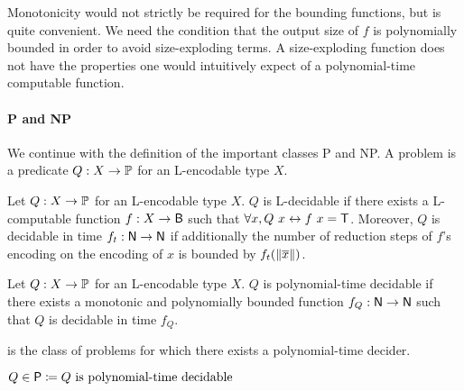 Monotonicity would not strictly be required for the bounding functions, but is quite convenient. We need the condition that the output size of $f$ is polynomially bounded in order to avoid size-exploding terms. A size-exploding function does not have the properties one would intuitively expect of a polynomial-time computable function.

\paragraph{\textsf{P} and \textsf{NP}}
We continue with the definition of the important classes \textsf{P} and \textsf{NP}. 
A problem is a predicate $Q : X \rightarrow \mathbb{P}$ for an L-encodable type $X$.
\begin{definition}
  Let $Q : X \rightarrow \mathbb{P}$ for an L-encodable type $X$. $Q$ is L-decidable if there exists a L-computable function $f : X \rightarrow \textsf{B}$ such that 
  $\forall x, Q~x \leftrightarrow f~x = \mathsf{T}$. 
  Moreover, $Q$ is decidable in time $f_t : \mathsf{N} \rightarrow \mathsf{N}$ if additionally the number of reduction steps of $f$'s encoding on the encoding of $x$ is bounded by $f_t(\left\lVert\overline{x}\right\rVert)$.
\end{definition}

\begin{definition}
  Let $Q : X \rightarrow \mathbb{P}$ for an L-encodable type $X$. $Q$ is polynomial-time decidable if there exists a monotonic and polynomially bounded function $f_Q : \mathsf{N} \rightarrow \mathsf{N}$ such that $Q$ is decidable in time $f_Q$. 
\end{definition}

\PC{} is the class of problems for which there exists a polynomial-time decider. 
\begin{definition}[\PC{}][inP]
  $Q \in \normalfont{\textsf{P}{}} \coloneqq Q \text{ is polynomial-time decidable} $
\end{definition}

